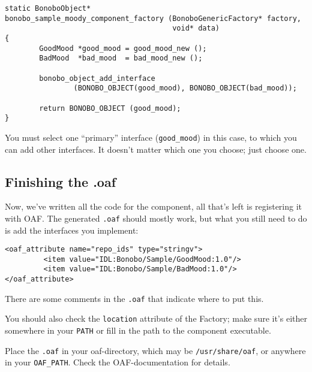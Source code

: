 \documentclass[final,10pt]{article}
\begin{document}
\begin{verbatim}
static BonoboObject*
bonobo_sample_moody_component_factory (BonoboGenericFactory* factory,
                                       void* data)
{
        GoodMood *good_mood = good_mood_new ();
        BadMood  *bad_mood  = bad_mood_new ();
        
        bonobo_object_add_interface
                (BONOBO_OBJECT(good_mood), BONOBO_OBJECT(bad_mood));
       
        return BONOBO_OBJECT (good_mood);
}
\end{verbatim}
You must select one ``primary'' interface (\verb|good_mood|) in this
case, to which you can add other interfaces. It doesn't matter which
one you choose; just choose one.

\subsection{Finishing the .oaf}
Now, we've written all the code for the component, all that's left is
registering it with OAF. The generated \verb|.oaf| should mostly work,
but what you still need to do is add the interfaces you implement:
\begin{verbatim}
<oaf_attribute name="repo_ids" type="stringv">
         <item value="IDL:Bonobo/Sample/GoodMood:1.0"/>
         <item value="IDL:Bonobo/Sample/BadMood:1.0"/>
</oaf_attribute>
\end{verbatim}
There are some comments in the \verb|.oaf| that indicate where to put
this. 

You should also check the \verb|location| attribute of the Factory;
make sure it's either somewhere in your \verb|PATH| or fill in the
path to the component executable.

Place the \verb|.oaf| in your oaf-directory, which may be
\verb|/usr/share/oaf|, or anywhere in your \verb|OAF_PATH|. Check
the OAF-documentation \cite{liboaf} for details.
\end{document}

